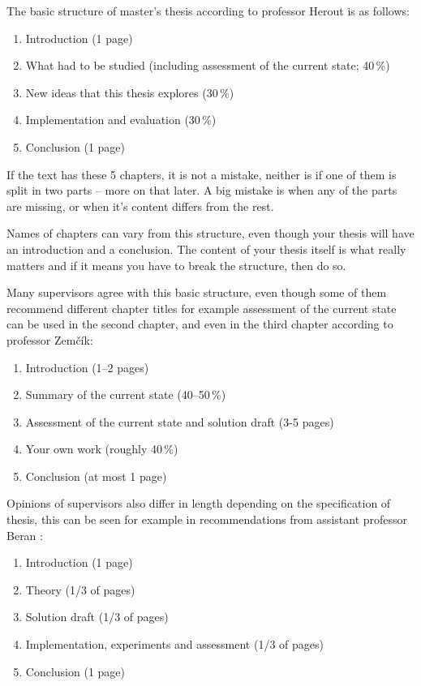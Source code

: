 The basic structure of master's thesis according to professor Herout is as follows:
\begin{enumerate}
  \item{Introduction (1 page)}
  \item{What had to be studied (including assessment of the current state; 40\,\%)}
  \item{New ideas that this thesis explores (30\,\%)}
  \item{Implementation and evaluation (30\,\%)}
  \item{Conclusion (1 page)}
\end{enumerate}

If the text has these 5 chapters, it is not a mistake, neither is if one of them is split in two parts -- more on that later. A big mistake is when any of the parts are missing, or when it's content differs from the rest.

Names of chapters can vary from this structure, even though your thesis will have an introduction and a conclusion. The content of your thesis itself is what really matters and if it means you have to break the structure, then do so.

Many supervisors agree with this basic structure, even though some of them recommend different chapter titles for example assessment of the current state can be used in the second chapter, and even in the third chapter according to professor Zemčík:
\begin{enumerate}
\item Introduction (1--2 pages)
\item Summary of the current state (40--50\,\%)
\item Assessment of the current state and solution draft (3-5 pages)
\item Your own work (roughly 40\,\%)
\item Conclusion (at most 1 page)
\end{enumerate}

Opinions of supervisors also differ in length depending on the specification of thesis, this can be seen for example in recommendations from assistant professor Beran \cite{Beran}:
\begin{enumerate}
\item Introduction (1 page)
\item Theory (1/3 of pages)
\item Solution draft (1/3 of pages)
\item Implementation, experiments and assessment (1/3 of pages)
\item Conclusion (1 page)
\end{enumerate}

